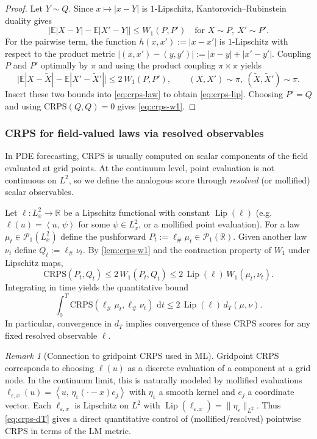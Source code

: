 \documentclass{article}
\numberwithin{equation}{section}
\theoremstyle{plain}
\theoremstyle{definition}
\theoremstyle{remark}
\newtheorem{remark}[theorem]{Remark}
\newcommand{\R}{\mathbb{R}}
\newcommand{\E}{\mathbb{E}}
\newcommand{\Pcal}{\mathcal{P}}
\newcommand{\dd}{\,\mathrm{d}}
\DeclareMathOperator{\Lip}{Lip}
\newcommand{\ip}[2]{\left\langle #1,\,#2 \right\rangle}
\begin{document}
\begin{proof}
Let $Y\sim Q$. Since $x\mapsto |x-Y|$ is $1$-Lipschitz, Kantorovich--Rubinstein duality gives
\[
\big|\E|X-Y|-\E|X'-Y|\big|\le W_1(P,P')
\quad\text{for }X\sim P,\ X'\sim P'.
\]
For the pairwise term, the function $h(x,x'):=|x-x'|$ is $1$-Lipschitz with respect to the product metric
$|(x,x')-(y,y')|:=|x-y|+|x'-y'|$. Coupling $P$ and $P'$ optimally by $\pi$ and using the product coupling $\pi\times\pi$
yields
\[
\Big|\E|X-\widetilde X|-\E|X'-\widetilde X'|\Big|\le 2\,W_1(P,P'),
\qquad (X,X')\sim\pi,\ (\widetilde X,\widetilde X')\sim\pi.
\]
Insert these two bounds into \eqref{eq:crps-law} to obtain \eqref{eq:crps-lip}. Choosing $P'=Q$ and using
$\mathrm{CRPS}(Q,Q)=0$ gives \eqref{eq:crps-w1}.
\end{proof}

\subsubsection{CRPS for field-valued laws via resolved observables}

In PDE forecasting, CRPS is usually computed on scalar components of the field evaluated at grid points.
At the continuum level, point evaluation is not continuous on $L^2$, so we define the analogous score through
\emph{resolved} (or mollified) scalar observables.

Let $\ell:L^2_x\to\R$ be a Lipschitz functional with constant $\Lip(\ell)$ (e.g.\ $\ell(u)=\ip{u}{\psi}$ for some
$\psi\in L^2_x$, or a mollified point evaluation). For a law $\mu_t\in\Pcal_1(L^2_x)$ define the pushforward
$P_t:=\ell_\#\mu_t\in\Pcal_1(\R)$. Given another law $\nu_t$ define $Q_t:=\ell_\#\nu_t$.
By \cref{lem:crps-w1} and the contraction property of $W_1$ under Lipschitz maps,
\begin{equation}\label{eq:crps-dt-control}
\mathrm{CRPS}(P_t,Q_t)
\le 2\,W_1(P_t,Q_t)
\le 2\,\Lip(\ell)\,W_1(\mu_t,\nu_t).
\end{equation}
Integrating in time yields the quantitative bound
\begin{equation}\label{eq:crps-dT}
\int_0^T \mathrm{CRPS}(\ell_\#\mu_t,\ell_\#\nu_t)\,\dd t
\le 2\,\Lip(\ell)\,d_T(\mu,\nu).
\end{equation}
In particular, convergence in $d_T$ implies convergence of these CRPS scores for any fixed resolved observable $\ell$.

\begin{remark}[Connection to gridpoint CRPS used in ML]
Gridpoint CRPS corresponds to choosing $\ell(u)$ as a discrete evaluation of a component at a grid node.
In the continuum limit, this is naturally modeled by mollified evaluations
$\ell_{\varepsilon,x}(u)=\ip{u}{\eta_\varepsilon(\cdot-x)e_j}$ with $\eta_\varepsilon$ a smooth kernel and $e_j$ a coordinate vector.
Each $\ell_{\varepsilon,x}$ is Lipschitz on $L^2$ with $\Lip(\ell_{\varepsilon,x})=\|\eta_\varepsilon\|_{L^2}$.
Thus \eqref{eq:crps-dT} gives a direct quantitative control of (mollified/resolved) pointwise CRPS in terms of the LM metric.
\end{remark}
\end{document}
